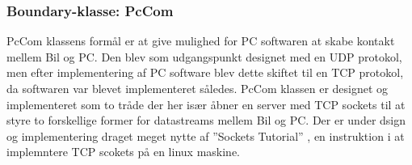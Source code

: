\subsubsection{Boundary-klasse: PcCom} \label{sec:pccom}
PcCom klassens formål er at give mulighed for PC softwaren at skabe kontakt mellem Bil og PC. Den blev som udgangspunkt designet med en UDP protokol, men efter implementering af PC software blev dette skiftet til en TCP protokol, da softwaren var blevet implementeret således. PcCom klassen er designet og implementeret som to tråde der her især åbner en server med TCP sockets til at styre to forskellige former for datastreams mellem Bil og PC. Der er under dsign og implementering draget meget nytte af ''Sockets Tutorial'' \cite{lib:socket_tutorial}, en instruktion i at implemntere TCP scokets på en linux maskine.


